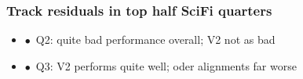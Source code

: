 \documentclass[aspectratio=1610, 12pt]{beamer}
\begin{document}
\begin{frame}\frametitle{Track residuals in top half SciFi quarters}
  \begin{itemize}
    \item $\bullet$\, Q2: quite bad performance overall; V2 not as bad
    \item $\bullet$\, Q3: V2 performs quite well; oder alignments far worse
  \end{itemize}
  \begin{figure}
  \end{figure}
\end{frame}
\end{document}
